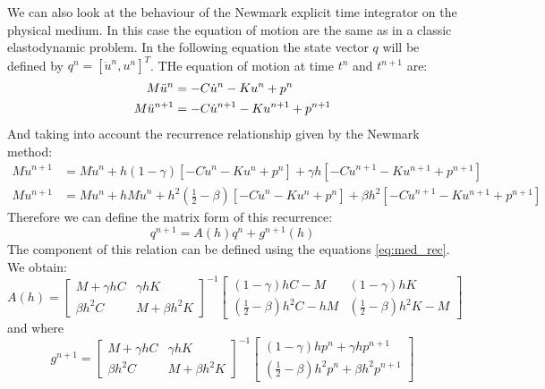 We can also look at the behaviour of the Newmark explicit time integrator on the physical medium. In this case the equation of motion are the same as in a classic elastodynamic problem. In the following equation the state vector $q$ will be defined by $q^n=[\dot{u}^n, u^n]^T$. THe equation of motion at time $t^n$ and $t^{n+1}$ are:
\begin{equation}
\begin{aligned}
    M  \Ddot{u}^n &= -C \Dot{u}^n - K u^n +p^n  \\
    M \Ddot{u}^{n+1} &= -C \Dot{u}^{n+1} - K u^{n+1} +p^{n+1} 
\end{aligned}
\end{equation}
And taking into account the recurrence relationship given by the Newmark method:
\begin{equation}
\begin{aligned}
    M \dot{u}^{n+1} &= M\Dot{u}^{n} + h(1-\gamma)\left[ -C \Dot{u}^n - K u^n +p^n   \right] + \gamma h \left[ -C \Dot{u}^{n+1} - K u^{n+1} +p^{n+1} \right] \\
    M u^{n+1} &= M u^{n} + h M \dot{u}^n + h^2(\frac{1}{2}-\beta)\left[ -C \Dot{u}^n - K u^n +p^n   \right] + \beta h^2 \left[ -C \Dot{u}^{n+1} - K u^{n+1} +p^{n+1} \right]
\end{aligned}
\label{eq:med_rec}
\end{equation}
Therefore we can define the matrix form of this recurrence:
\begin{equation}
    q^{n+1} = A(h) q^n + g^{n+1}(h)
\end{equation}
The component of this relation can be defined using the equations \ref{eq:med_rec}. We obtain:
\begin{equation}
    A(h) = \begin{bmatrix}M+\gamma h C & \gamma h K \\ \beta h^2 C & M+ \beta h^2 K   \end{bmatrix}^{-1} \begin{bmatrix}(1-\gamma)hC-M& (1-\gamma)hK \\ (\frac{1}{2}-\beta)h^2C-hM& (\frac{1}{2}-\beta)h^2K-M \end{bmatrix} 
\end{equation}
and where
\begin{equation}
    g^{n+1}=\begin{bmatrix}M+\gamma h C & \gamma h K \\ \beta h^2 C & M+ \beta h^2 K   \end{bmatrix}^{-1} \begin{bmatrix}(1-\gamma)h p^n+\gamma h p^{n+1} \\ (\frac{1}{2}-\beta)h^2p^n+\beta h^2 p^{n+1}  \end{bmatrix}
\end{equation}
